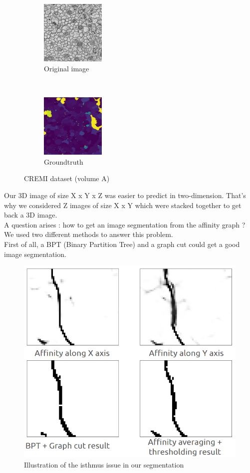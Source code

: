 \begin{figure}[t!]
    \centering
    \begin{subfigure}[t]{0.5\textwidth}
        \centering
        \includegraphics[height=1.2in]{./images/cremi_orig_1.png}
        \caption{Original image}
    \end{subfigure}%
    ~ 
    \begin{subfigure}[t]{0.5\textwidth}
        \centering
        \includegraphics[height=1.2in]{./images/cremi_gt_1.png}
        \caption{Groundtruth}
    \end{subfigure}
    \caption{CREMI dataset (volume A)}
\end{figure}

Our 3D image of size X x Y x Z was easier to predict in two-dimension. 
That's why we considered Z images of size X x Y which were stacked together to get back a 3D image.\\


A question arises : how to get an image segmentation from the affinity graph ?\\

We used two different methods to answer this problem.\\
First of all, a BPT (Binary Partition Tree) and a graph cut could get a good image segmentation. 

\begin{figure}[!htbp]
	\centering
	\includegraphics[width=0.8\linewidth]{./images/cremi_isthmus.png}
	\caption{Illustration of the isthmus issue in our segmentation}%
	\label{fig:cremi_isthmus}
\end{figure}


